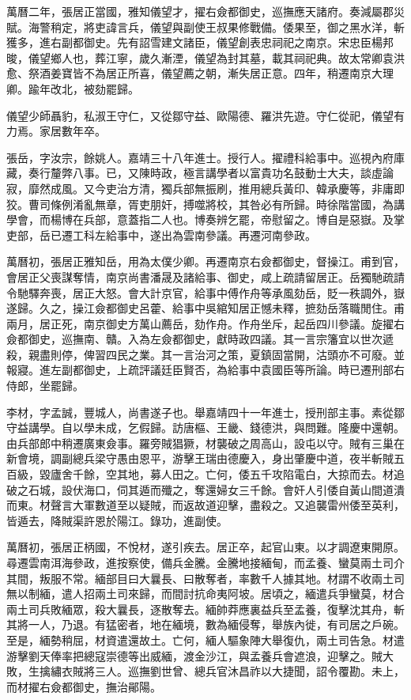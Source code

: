 \begin{pinyinscope}
萬曆二年，張居正當國，雅知儀望才，擢右僉都御史，巡撫應天諸府。奏減屬郡災賦。海警稍定，將吏諱言兵，儀望與副使王叔果修戰備。倭果至，御之黑水洋，斬獲多，進右副都御史。先有詔雪建文諸臣，儀望創表忠祠祀之南京。宋忠臣楊邦晙，儀望鄉人也，葬江寧，歲久漸湮，儀望為封其墓，載其祠祀典。故太常卿袁洪愈、祭酒姜寶皆不為居正所喜，儀望薦之朝，漸失居正意。四年，稍遷南京大理卿。踰年改北，被劾罷歸。

儀望少師聶豹，私淑王守仁，又從鄒守益、歐陽德、羅洪先遊。守仁從祀，儀望有力焉。家居數年卒。

張岳，字汝宗，餘姚人。嘉靖三十八年進士。授行人。擢禮科給事中。巡視內府庫藏，奏行釐弊八事。已，又陳時政，極言講學者以富貴功名鼓動士大夫，談虛論寂，靡然成風。又今吏治方清，獨兵部無振刷，推用總兵黃印、韓承慶等，非庸即狡。曹司條例淆亂無章，胥吏朋奸，搏噬將校，其咎必有所歸。時徐階當國，為講學會，而楊博在兵部，意蓋指二人也。博奏辨乞罷，帝慰留之。博自是惡嶽。及掌吏部，岳已遷工科左給事中，遂出為雲南參議。再遷河南參政。

萬曆初，張居正雅知岳，用為太僕少卿。再遷南京右僉都御史，督操江。甫到官，會居正父喪謀奪情，南京尚書潘晟及諸給事、御史，咸上疏請留居正。岳獨馳疏請令馳驛奔喪，居正大怒。會大計京官，給事中傅作舟等承風劾岳，貶一秩調外，嶽遂歸。久之，操江僉都御史呂藿、給事中吳綰知居正憾未釋，摭劾岳落職閒住。甫兩月，居正死，南京御史方萬山薦岳，劾作舟。作舟坐斥，起岳四川參議。旋擢右僉都御史，巡撫南、贛。入為左僉都御史，獻時政四議。其一言宗籓宜以世次遞殺，親盡則停，俾習四民之業。其一言治河之策，夏鎮固當開，沽頭亦不可廢。並報寢。進左副都御史，上疏評議廷臣賢否，為給事中袁國臣等所論。時已遷刑部右侍郎，坐罷歸。

李材，字孟誠，豐城人，尚書遂子也。舉嘉靖四十一年進士，授刑部主事。素從鄒守益講學。自以學未成，乞假歸。訪唐樞、王畿、錢德洪，與問難。隆慶中還朝。由兵部郎中稍遷廣東僉事。羅旁賊猖獗，材襲破之周高山，設屯以守。賊有三巢在新會境，調副總兵梁守愚由恩平，游擊王瑞由德慶入，身出肇慶中道，夜半斬賊五百級，毀廬舍千餘，空其地，募人田之。亡何，倭五千攻陷電白，大掠而去。材追破之石城，設伏海口，伺其遁而殲之，奪還婦女三千餘。會奸人引倭自黃山間道潰而東。材聲言大軍數道至以疑賊，而返故道迎擊，盡殺之。又追襲雷州倭至英利，皆遁去，降賊渠許恩於陽江。錄功，進副使。

萬曆初，張居正柄國，不悅材，遂引疾去。居正卒，起官山東。以才調遼東開原。尋遷雲南洱海參政，進按察使，備兵金騰。金騰地接緬甸，而孟養、蠻莫兩土司介其間，叛服不常。緬部目曰大曩長、曰散奪者，率數千人據其地。材謂不收兩土司無以制緬，遣人招兩土司來歸，而間討抗命夷阿坡。居頃之，緬遣兵爭蠻莫，材合兩土司兵敗緬眾，殺大曩長，逐散奪去。緬帥莽應裏益兵至孟養，復擊沈其舟，斬其將一人，乃退。有猛密者，地在緬境，數為緬侵奪，舉族內徙，有司居之戶碗。至是，緬勢稍屈，材資遣還故土。亡何，緬人驅象陣大舉復仇，兩土司告急。材遣游擊劉天俸率把總寇崇德等出威緬，渡金沙江，與孟養兵會遮浪，迎擊之。賊大敗，生擒繡衣賊將三人。巡撫劉世曾、總兵官沐昌祚以大捷聞，詔令覆勘。未上，而材擢右僉都御史，撫治鄖陽。


\end{pinyinscope}
